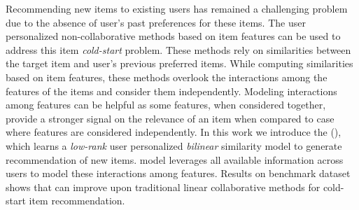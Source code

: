 Recommending new items to existing users has remained a challenging problem
due to the absence of user's past preferences for these items.  
The user personalized non-collaborative methods based on item features 
can be used to address this item \emph{cold-start} problem. 
These methods rely on similarities between the target item and user's previous preferred items. 
While computing similarities based on item features, these
methods overlook the interactions among the features of the items and 
consider them independently. Modeling interactions among features can be helpful 
as some features, when considered together, provide a stronger signal on the 
relevance of an item when compared to case where features are considered independently. 
In this work we introduce the \CFEXP 
(\CF), which learns a \emph{low-rank} user personalized \emph{bilinear} similarity model to
generate \TOPN recommendation of new items. \CF model leverages all available
information across users to model these interactions among features.
Results on benchmark
dataset shows that \CF can improve upon traditional linear collaborative methods for
cold-start \TOPN item recommendation.
